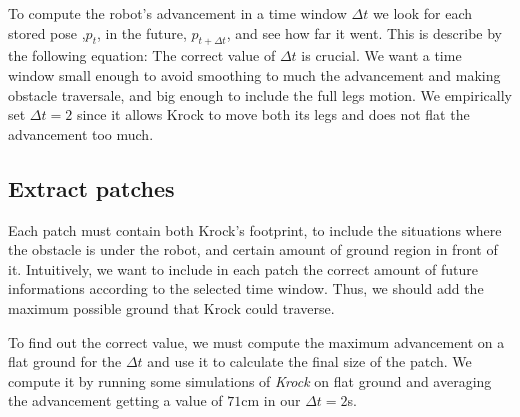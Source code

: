 \documentclass[../document.tex]{subfiles}
\begin{document}
To compute the robot's advancement in a time window $\Delta t$ we look for each stored pose ,$p_t$, in the future, $p_{t + \Delta t}$, and see how far it went. This is describe by the following equation: 
The correct value of $\Delta t$ is crucial. We want a time window small enough to avoid smoothing to much the advancement and making obstacle traversale, and big enough to include the full legs motion. We empirically set $\Delta t = 2$ since it allows Krock to move both its legs and does not flat the advancement too much. 
\subsection{Extract patches}
Each patch must contain both Krock's footprint, to include the situations where the obstacle is under the robot, and certain amount of ground region in front of it. Intuitively, we want to include in each patch the correct amount of future informations according to the selected time window. Thus, we should add the maximum possible ground that Krock could traverse. 

To find out the correct value, we must compute the maximum advancement on a flat ground for the $\Delta t$ and use it to calculate the final size of the patch. We compute it by running some simulations of \emph{Krock} on flat ground and averaging the advancement getting a value of $71$cm in our $\Delta t = 2$s.
\end{document}
